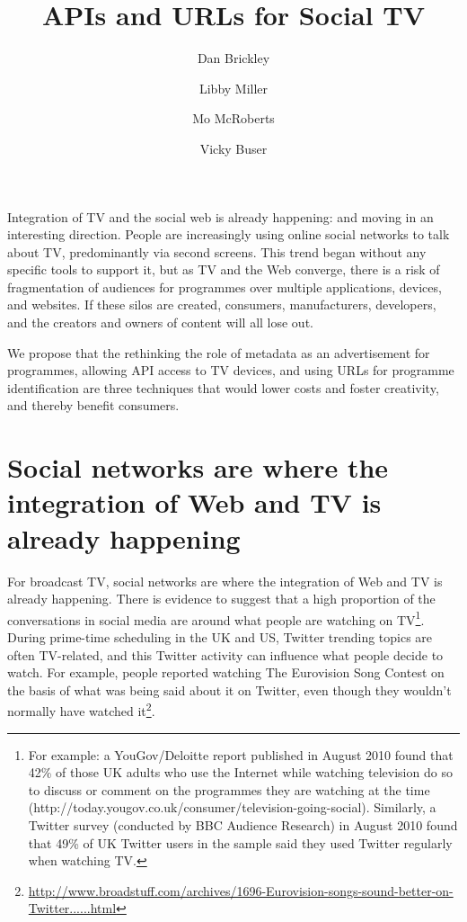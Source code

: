 \documentclass[]{article}%
\date{}
\title{APIs and URLs for Social TV}
\author{Dan Brickley}
\affil{Vrij Universiteit, Amsterdam; NoTube Project}
\author{Libby Miller}
\affil{BBC R\&D; NoTube Project}
\author{Mo McRoberts}
\affil{Project Baird}
\author{Vicky Buser}
\affil{BBC R\&D; NoTube Project}
\begin{document}
\ifpdf
{}
\else
{}
\fi

\maketitle
Integration of TV and the social web is already happening: and moving in an interesting direction. People are increasingly using online social networks to talk about TV, predominantly via second screens. This trend began without any specific tools to support it, but as TV and the Web converge, there is a risk of fragmentation of audiences for programmes over multiple applications, devices, and websites. If these silos are created, consumers, manufacturers, developers, and the creators and owners of content will all lose out.

We propose that the rethinking the role of metadata as an advertisement for programmes, allowing API access to TV devices, and using URLs for programme identification are three techniques that would lower costs and foster creativity, and thereby benefit consumers.

\section{Social networks are where the integration of Web and TV is already happening}

For broadcast TV, social networks are where the integration of Web and TV is already happening. There is evidence to suggest that a high proportion of the conversations in social media are around what people are watching on TV\footnote{For example: a YouGov/Deloitte report published in August 2010 found that 42\% of those UK adults who use the Internet while watching television do so to discuss or comment on the programmes they are watching at the time (http://today.yougov.co.uk/consumer/television-going-social). Similarly, a Twitter survey (conducted by BBC Audience Research) in August 2010 found that 49\% of UK Twitter users in the sample said they used Twitter regularly when watching TV.}. During prime-time scheduling in the UK and US, Twitter trending topics are often TV-related, and this Twitter activity can influence what people decide to watch. For example, people reported watching The Eurovision Song Contest on the basis of what was being said about it on Twitter, even though they wouldn't normally have watched it\footnote{\url{http://www.broadstuff.com/archives/1696-Eurovision-songs-sound-better-on-Twitter......html}}. 
\end{document}
